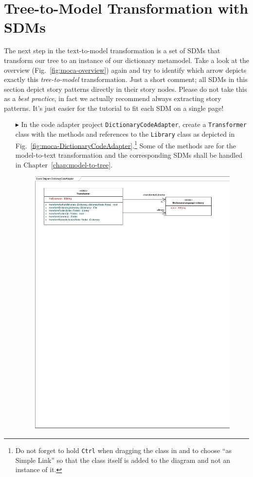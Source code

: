 \section{Tree-to-Model Transformation with SDMs}

The next step in the text-to-model transformation is a set of SDMs that transform our tree to an instance of our dictionary metamodel.
Take a look at the overview (Fig.~\ref{fig:moca-overview}) again and try to identify which arrow depicts exactly this \emph{tree-to-model} transformation.
Just a short comment;  all SDMs in this section depict story patterns directly in their story nodes.
Please do not take this as a \emph{best practice}, in fact we actually recommend always extracting story patterns.
It's just easier for the tutorial to fit each SDM on a single page!

\begin{enumerate}
  \item[$\blacktriangleright$]  In the code adapter project
  \texttt{DictionaryCodeAdapter}, create a \texttt{Trans\-for\-mer} class with the methods and references to the \texttt{Library} class as depicted in Fig.~\ref{fig:moca-DictionaryCodeAdapter}.\footnote{Do not forget to hold \texttt{Ctrl} when dragging the class in and to choose ``as Simple Link'' so that the class itself is added to the diagram and not an instance of it.}
  Some of the methods are for the model-to-text transformation and the corresponding SDMs shall be handled in Chapter~\ref{chap:model-to-tree}.
\begin{figure}[!htbp]
\begin{center}
 \includegraphics[width=\textwidth]{pics/moca/3MocaTreeToModel/DictionaryCodeAdapter}

\end{center}
\end{figure}
\end{enumerate}
